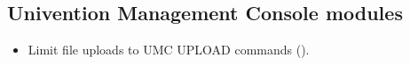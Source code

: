 

%




\subsection{Univention Management Console modules}
\begin{itemize}
\item Limit file uploads to UMC UPLOAD commands ().
\end{itemize}

